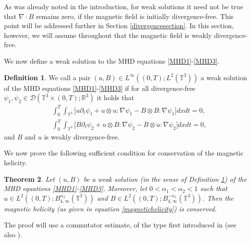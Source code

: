 \documentclass[12pt,a4paper]{article}
\newtheorem{theorem}{Theorem}[section]
\theoremstyle{definition}
\newtheorem{definition}[theorem]{Definition}
\theoremstyle{remark}
\numberwithin{equation}{section}
\begin{document}
As was already noted in the introduction, for weak solutions it need not be true that $\nabla \cdot B$ remains zero, if the magnetic field is initially divergence-free. This point will be addressed further in Section \ref{divergencesection}. In this section, however, we will assume throughout that the magnetic field is weakly divergence-free.

We now define a weak solution to the MHD equations \eqref{MHD1}-\eqref{MHD3}.
\begin{definition} \label{weaksolMHDdivergencefree}
We call a pair $(u,B) \in L^\infty ((0,T); L^2 (\mathbb{T}^3))$ a weak solution of the MHD equations \eqref{MHD1}-\eqref{MHD3} if for all divergence-free $\psi_1, \psi_2 \in \mathcal{D} (\mathbb{T}^3 \times (0,T);\mathbb{R}^3)$ it holds that
\begin{align}
&\int_0^T \int_{\mathbb{T}^3} \bigg[ u \partial_t \psi_1 + u \otimes u : \nabla \psi_1 - B \otimes B : \nabla \psi_1 \bigg] dx dt = 0, \label{mhdweakform1} \\
&\int_0^T \int_{\mathbb{T}^3} \bigg[ B \partial_t \psi_2 + u \otimes B : \nabla \psi_2 - B \otimes u : \nabla \psi_2 \bigg] dx dt = 0, \label{mhdweakform2}
\end{align}
and $B$ and $u$ is weakly divergence-free. 
\end{definition}
We now prove the following sufficient condition for conservation of the magnetic helicity.
\begin{theorem} \label{maghelicityconservation}
Let $(u,B)$ be a weak solution (in the sense of Definition \ref{weaksolMHDdivergencefree}) of the MHD equations \eqref{MHD1}-\eqref{MHD3}. Moreover, let $0 < \alpha_1 < \alpha_2 < 1$  such that $u \in L^2 ((0,T); B^{\alpha_2}_{4,\infty} (\mathbb{T}^3) )$ and $B \in L^2 ((0,T); B^{-\alpha_1}_{4,\infty} (\mathbb{T}^3))$. Then the magnetic helicity (as given in equation \eqref{magnetichelicity}) is conserved.
\end{theorem}
The proof will use a commutator estimate, of the type first introduced in \cite{constantin} (see also \cite{titi2018}).
\end{document}
